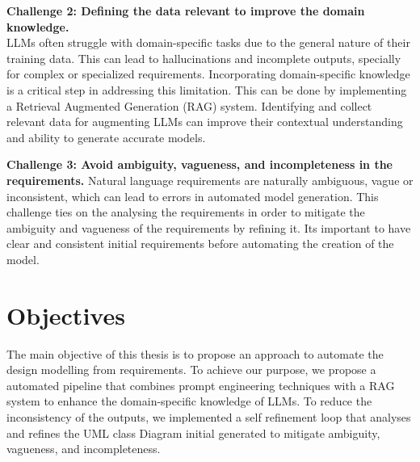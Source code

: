 \vspace{1.5 em}
\textbf{Challenge 2: Defining the data relevant to improve the domain knowledge.}\\
LLMs often struggle with domain-specific tasks due to the general nature of their training data. This can lead to hallucinations and incomplete outputs, specially for complex or specialized requirements.
Incorporating domain-specific knowledge is a critical step in addressing this limitation. This can be done by implementing a Retrieval Augmented Generation (RAG) system. Identifying and collect relevant data for augmenting LLMs can improve their contextual understanding and ability to generate accurate models.

\vspace{1.5 em}
\textbf{Challenge 3: Avoid ambiguity, vagueness, and incompleteness in the requirements.}
Natural language requirements are naturally ambiguous, vague or inconsistent, which can lead to errors in automated model generation. This challenge ties on the analysing the requirements in order to mitigate the ambiguity and vagueness of the requirements by refining it. Its important to have clear and consistent initial requirements before automating the creation of the model.

\vspace{2 em}
\section{Objectives}

The main objective of this thesis is to propose an approach to automate the design modelling from requirements. To achieve our purpose, we propose a automated pipeline that combines prompt engineering techniques with a RAG system to enhance the domain-specific knowledge of LLMs. To reduce the inconsistency of the outputs, we implemented a self refinement loop that analyses and refines the UML class Diagram initial generated to mitigate ambiguity, vagueness, and incompleteness.
